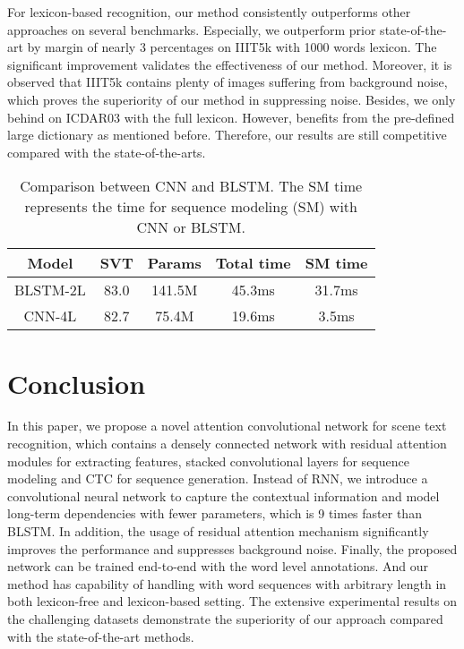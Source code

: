 \documentclass[letterpaper]{article} %
\begin{document}
For lexicon-based recognition, our method consistently outperforms other approaches on several benchmarks. Especially, we outperform prior state-of-the-art \cite{shi2016end} by margin of nearly 3 percentages on IIIT5k with 1000 words lexicon. The significant improvement validates the effectiveness of our method. Moreover, it is observed that IIIT5k contains plenty of images suffering from background noise, which proves the superiority of our method in suppressing noise. Besides, we only behind \cite{jaderberg2016reading} on ICDAR03 with the full lexicon. However, \cite{jaderberg2016reading} benefits from the pre-defined large dictionary as mentioned before. Therefore, our results are still competitive compared with the state-of-the-arts.

\begin{table}
  \centering
  \caption{Comparison between CNN and BLSTM. The SM time represents the time for sequence modeling (SM) with CNN or BLSTM.}

\begin{tabular}{c|c|c|c|c}
  \hline
  Model & SVT & Params & Total time & SM time \\
  \hline
  BLSTM-2L & 83.0 & 141.5M & 45.3ms & 31.7ms\\
  CNN-4L & 82.7 & 75.4M & 19.6ms & 3.5ms\\
  \hline
\end{tabular}
\label{tab:003}
\end{table}

\section{Conclusion}

In this paper, we propose a novel attention convolutional network for scene text recognition, which contains a densely connected network with residual attention modules for extracting features, stacked convolutional layers for sequence modeling and CTC for sequence generation. Instead of RNN, we introduce a convolutional neural network to capture the contextual information and model long-term dependencies with fewer parameters, which is 9 times faster than BLSTM. In addition, the usage of residual attention mechanism significantly improves the performance and suppresses background noise. Finally, the proposed network can be trained end-to-end with the word level annotations. And our method has capability of handling with word sequences with arbitrary length in both lexicon-free and lexicon-based setting. The extensive experimental results on the challenging datasets demonstrate the superiority of our approach compared with the state-of-the-art methods.





\end{document}
